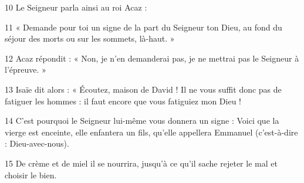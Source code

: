 
10 Le Seigneur parla ainsi au roi Acaz :

11 « Demande pour toi un signe de la part du Seigneur ton Dieu, au fond du séjour des morts ou sur les sommets, là-haut. »

12 Acaz répondit : « Non, je n’en demanderai pas, je ne mettrai pas le Seigneur à l’épreuve. »

13 Isaïe dit alors : « Écoutez, maison de David ! Il ne vous suffit donc pas de fatiguer les hommes : il faut encore que vous fatiguiez mon Dieu !

14 C’est pourquoi le Seigneur lui-même vous donnera un signe : Voici que la vierge est enceinte, elle enfantera un fils, qu’elle appellera Emmanuel (c’est-à-dire : Dieu-avec-nous).

15 De crème et de miel il se nourrira, jusqu’à ce qu’il sache rejeter le mal et choisir le bien.